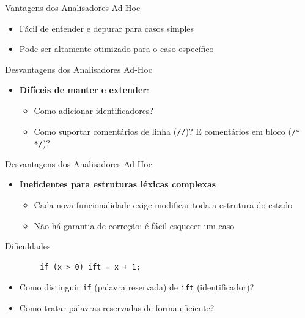 \begin{frame}{Vantagens dos Analisadores Ad-Hoc}

    \begin{itemize}

        \item
        Fácil de entender e depurar para casos simples
        \item
        Pode ser altamente otimizado para o caso específico
    \end{itemize}
\end{frame}

\begin{frame}[fragile]{Desvantagens dos Analisadores Ad-Hoc}

    \begin{itemize}

        \item
        \textbf{Difíceis de manter e extender}:

        \begin{itemize}

            \item
            Como adicionar identificadores?
            \item
            Como suportar comentários de linha (\texttt{//})? E
            comentários em bloco (\texttt{/* */})?
        \end{itemize}
    \end{itemize}
\end{frame}

\begin{frame}{Desvantagens dos Analisadores Ad-Hoc}

    \begin{itemize}

        \item
        \textbf{Ineficientes para estruturas léxicas complexas}

        \begin{itemize}

            \item
            Cada nova funcionalidade exige modificar toda a estrutura do estado
            \item
            Não há garantia de correção: é fácil esquecer um caso
        \end{itemize}
    \end{itemize}
\end{frame}

\begin{frame}[fragile]{Dificuldades}

    \begin{lstlisting}
        if (x > 0) ift = x + 1;
    \end{lstlisting}

    \begin{itemize}

        \item
        Como distinguir \texttt{if} (palavra reservada) de
        \texttt{ift} (identificador)?
        \item
        Como tratar palavras reservadas de forma eficiente?
    \end{itemize}
\end{frame}

